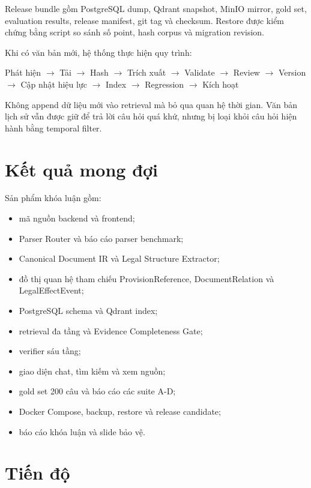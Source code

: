 \documentclass[12pt,a4paper]{article}
\begin{document}
Release bundle gồm PostgreSQL dump, Qdrant snapshot, MinIO mirror, gold set, evaluation results, release manifest, git tag và checksum. Restore được kiểm chứng bằng script so sánh số point, hash corpus và migration revision.

Khi có văn bản mới, hệ thống thực hiện quy trình:

\begin{center}
\small
Phát hiện
$\rightarrow$ Tải
$\rightarrow$ Hash
$\rightarrow$ Trích xuất
$\rightarrow$ Validate
$\rightarrow$ Review
$\rightarrow$ Version
$\rightarrow$ Cập nhật hiệu lực
$\rightarrow$ Index
$\rightarrow$ Regression
$\rightarrow$ Kích hoạt
\end{center}

Không append dữ liệu mới vào retrieval mà bỏ qua quan hệ thời gian. Văn bản lịch sử vẫn được giữ để trả lời câu hỏi quá khứ, nhưng bị loại khỏi câu hỏi hiện hành bằng temporal filter.

\section{Kết quả mong đợi}

Sản phẩm khóa luận gồm:

\begin{itemize}
  \item mã nguồn backend và frontend;
  \item Parser Router và báo cáo parser benchmark;
  \item Canonical Document IR và Legal Structure Extractor;
  \item đồ thị quan hệ tham chiếu ProvisionReference, DocumentRelation và LegalEffectEvent;
  \item PostgreSQL schema và Qdrant index;
  \item retrieval đa tầng và Evidence Completeness Gate;
  \item verifier sáu tầng;
  \item giao diện chat, tìm kiếm và xem nguồn;
  \item gold set 200 câu và báo cáo các suite A-D;
  \item Docker Compose, backup, restore và release candidate;
  \item báo cáo khóa luận và slide bảo vệ.
\end{itemize}

\section{Tiến độ}
\end{document}
